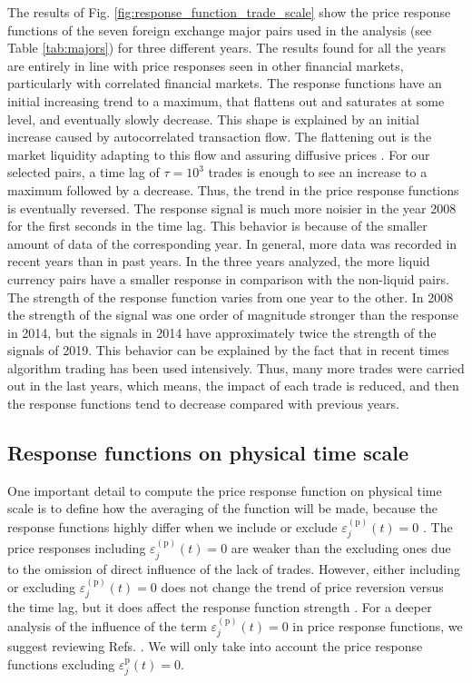 The results of Fig. \ref{fig:response_function_trade_scale} show the
price response functions of the seven foreign exchange major pairs used in the
analysis (see Table \ref{tab:majors}) for three different years. The results
found for all the years are entirely in line with price responses seen in other
financial markets, particularly with correlated financial markets. The response
functions have an initial increasing trend to a maximum, that flattens out and
saturates at some level, and eventually slowly decrease. This shape is
explained by an initial increase caused by autocorrelated transaction flow. The
flattening out is the market liquidity adapting to this flow and assuring
diffusive prices \cite{EMH_lillo}. For our selected pairs, a time lag of
$\tau = 10^{3} $ trades is enough to see an increase to a maximum followed by a
decrease. Thus, the trend in the price response functions is eventually
reversed. The response signal is much more noisier in the year 2008 for the
first seconds in the time lag. This behavior is because of the smaller amount
of data of the corresponding year. In general, more data was recorded in recent
years than in past years. In the three years analyzed, the more liquid currency
pairs have a smaller response in comparison with the non-liquid pairs.  The
strength of the response function varies from one year to the other. In 2008
the strength of the signal was one order of magnitude stronger than the
response in 2014, but the signals in 2014 have approximately twice the strength
of the signals of 2019. This behavior can be explained by the fact that in
recent times algorithm trading has been used intensively. Thus, many more
trades were carried out in the last years, which means, the impact of each
trade is reduced, and then the response functions tend to decrease compared
with previous years.

\subsection{Response functions on physical time scale}
\label{subsec:response_function_physical}

One important detail to compute the price response function on physical time
scale is to define how the averaging of the function will be made, because the
response functions highly differ when we include or exclude
$\varepsilon^{\left(\textrm{p}\right)}_j \left( t\right) = 0$
\cite{Wang_2016_cross}. The price responses including
$\varepsilon^{\left(\textrm{p}\right)}_j \left( t\right) = 0$ are weaker than
the excluding ones due to the omission of direct influence of the lack of
trades. However, either including or excluding
$\varepsilon^{\left(\textrm{p}\right)}_j \left( t\right) = 0$ does not change
the trend of price reversion versus the time lag, but it does affect the
response function strength \cite{Wang_2016_avg}. For a deeper analysis of the
influence of the term
$\varepsilon^{\left(\textrm{p}\right)}_j \left( t\right) = 0$ in price response
functions, we suggest reviewing Refs. \cite{Wang_2016_avg,Wang_2016_cross}. We
will only take into account the price response functions excluding
$\varepsilon^{\textrm{p}}_j \left( t\right) = 0$.


